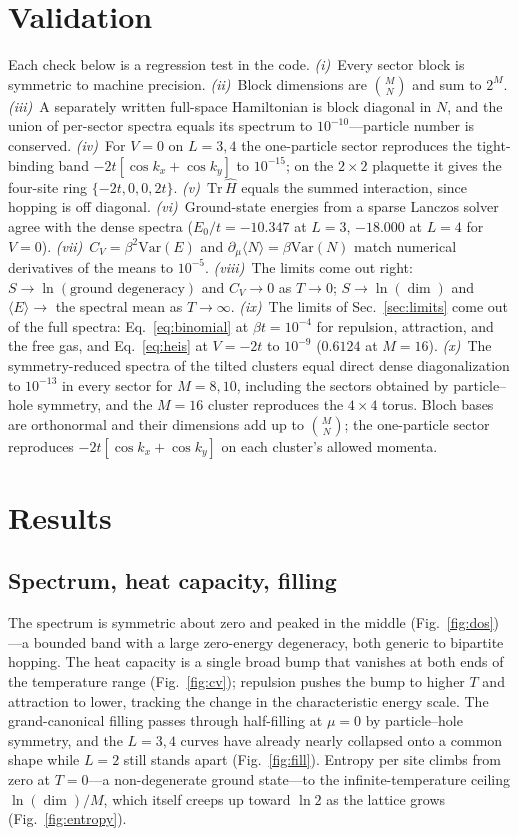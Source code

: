 \documentclass[twocolumn,10pt]{article}
\newcommand{\avg}[1]{\langle #1 \rangle}
\newcommand{\Tr}{\mathrm{Tr}\,}
\newcommand{\Var}{\mathrm{Var}}
\begin{document}
\section{Validation}
Each check below is a regression test in the code.
\emph{(i)}~Every sector block is symmetric to machine precision.
\emph{(ii)}~Block dimensions are $\binom{M}{N}$ and sum to $2^M$.
\emph{(iii)}~A separately written full-space Hamiltonian is block diagonal in $N$,
and the union of per-sector spectra equals its spectrum to $10^{-10}$---particle
number is conserved.
\emph{(iv)}~For $V=0$ on $L=3,4$ the one-particle sector reproduces the
tight-binding band $-2t[\cos k_x+\cos k_y]$ to $10^{-15}$; on the $2\times2$
plaquette it gives the four-site ring $\{-2t,0,0,2t\}$.
\emph{(v)}~$\Tr\hat H$ equals the summed interaction, since hopping is off
diagonal.
\emph{(vi)}~Ground-state energies from a sparse Lanczos solver agree with the
dense spectra ($E_0/t=-10.347$ at $L=3$, $-18.000$ at $L=4$ for $V=0$).
\emph{(vii)}~$C_V=\beta^2\Var(E)$ and $\partial_\mu\avg N=\beta\Var(N)$ match
numerical derivatives of the means to $10^{-5}$.
\emph{(viii)}~The limits come out right: $S\to\ln(\text{ground degeneracy})$ and
$C_V\to0$ as $T\to0$; $S\to\ln(\dim)$ and $\avg E\to$ the spectral mean as
$T\to\infty$.
\emph{(ix)}~The limits of Sec.~\ref{sec:limits} come out of the full spectra:
Eq.~\eqref{eq:binomial} at $\beta t=10^{-4}$ for repulsion, attraction, and the
free gas, and Eq.~\eqref{eq:heis} at $V=-2t$ to $10^{-9}$ ($0.6124$ at $M=16$).
\emph{(x)}~The symmetry-reduced spectra of the tilted clusters equal direct dense
diagonalization to $10^{-13}$ in every sector for $M=8,10$, including the sectors
obtained by particle--hole symmetry, and the $M=16$ cluster reproduces the
$4\times4$ torus. Bloch bases are orthonormal and their dimensions add up to
$\binom MN$; the one-particle sector reproduces $-2t[\cos k_x+\cos k_y]$ on each
cluster's allowed momenta.

\section{Results}
\subsection{Spectrum, heat capacity, filling}
The spectrum is symmetric about zero and peaked in the middle
(Fig.~\ref{fig:dos})---a bounded band with a large zero-energy degeneracy, both
generic to bipartite hopping. The heat capacity is a single broad bump that
vanishes at both ends of the temperature range (Fig.~\ref{fig:cv}); repulsion
pushes the bump to higher $T$ and attraction to lower, tracking the change in the
characteristic energy scale. The grand-canonical filling passes through
half-filling at $\mu=0$ by particle--hole symmetry, and the $L=3,4$ curves have
already nearly collapsed onto a common shape while $L=2$ still stands apart
(Fig.~\ref{fig:fill}). Entropy per site climbs from zero at $T=0$---a
non-degenerate ground state---to the infinite-temperature ceiling
$\ln(\dim)/M$, which itself creeps up toward $\ln2$ as the lattice grows
(Fig.~\ref{fig:entropy}).
\end{document}
